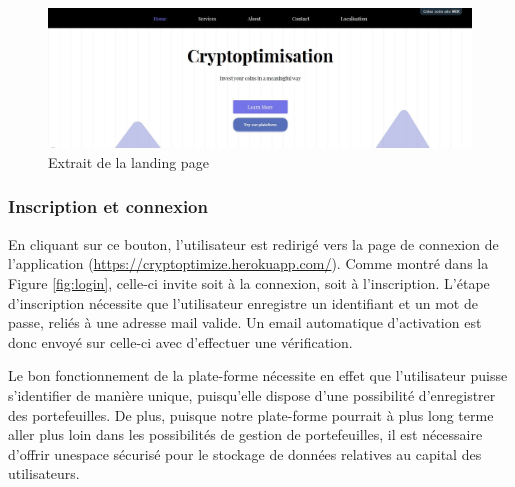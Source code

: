 \documentclass[a4paper, 10pt]{article}
\begin{document}
\begin{figure}[ht!]
\begin{center}
\includegraphics[width=1.0\textwidth]{images/landing.JPG}
\caption{Extrait de la landing page}
\label{fig:landingpage}
\end{center}
\end{figure}

\subsubsection{Inscription et connexion}
\label{sec:developpement_pages_inscription}

En cliquant sur ce bouton, l'utilisateur est redirigé vers la page de connexion de l'application (\url{https://cryptoptimize.herokuapp.com/}). Comme montré dans la Figure \ref{fig:login}, celle-ci invite soit à la connexion, soit à l'inscription. L'étape d'inscription nécessite que l'utilisateur enregistre un identifiant et un mot de passe, reliés à une adresse mail valide. Un email automatique d'activation est donc envoyé sur celle-ci avec d'effectuer une vérification.

Le bon fonctionnement de la plate-forme nécessite en effet que l'utilisateur puisse s'identifier de manière unique, puisqu'elle dispose d'une possibilité d'enregistrer des portefeuilles. De plus, puisque notre plate-forme pourrait à plus long terme aller plus loin dans les possibilités de gestion de portefeuilles, il est nécessaire d'offrir unespace sécurisé pour le stockage de données relatives au capital des utilisateurs.
\end{document}

